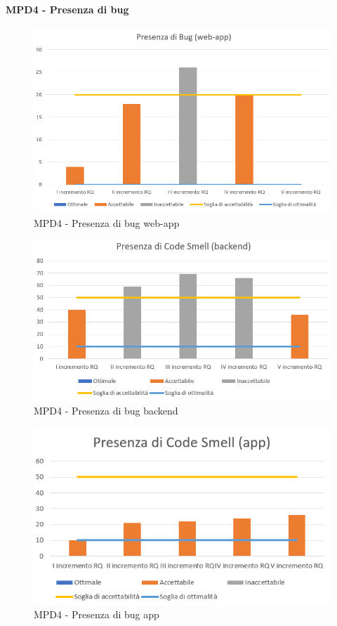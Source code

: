  \clearpage
  \paragraph{MPD4 - Presenza di bug}
  \begin{figure}[h!]
    \centering
      \includegraphics[scale=1]{Immagini/Bug WA.PNG}
    \caption{MPD4 - Presenza di bug web-app}
  \end{figure}

  \begin{figure}[h!]
    \centering
      \includegraphics[scale=1]{Immagini/CodeSmell BE.PNG}
    \caption{MPD4 - Presenza di bug backend}
  \end{figure}

  \begin{figure}[h!]
    \centering
      \includegraphics[scale=1]{Immagini/CodeSmell APP.PNG}
    \caption{MPD4 - Presenza di bug app}
  \end{figure}

